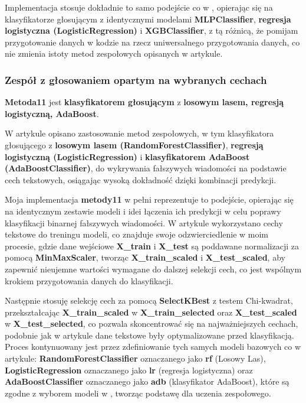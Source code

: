 Implementacja stosuje dokładnie to samo podejście co w \cite{metoda10}, opierając się na klasyfikatorze głosującym z identycznymi modelami \textbf{MLPClassifier}, \textbf{regresja logistyczna (LogisticRegression)} i \textbf{XGBClassifier}, z tą różnicą, że pomijam przygotowanie danych w kodzie na rzecz uniwersalnego przygotowania danych, co nie zmienia istoty metod zespołowych opisanych w artykule.

\subsubsection{Zespół z głosowaniem opartym na wybranych cechach}
\textbf{Metoda11} jest \textbf{klasyfikatorem głosującym} z \textbf{losowym lasem, regresją logistyczną, AdaBoost}.

W artykule \cite{metoda11} opisano zastosowanie metod zespołowych, w tym klasyfikatora głosującego z \textbf{losowym lasem (RandomForestClassifier)}, \textbf{regresją logistyczną (LogisticRegression)} i \textbf{klasyfikatorem AdaBoost (AdaBoostClassifier)}, do wykrywania fałszywych wiadomości na podstawie cech tekstowych, osiągając wysoką dokładność dzięki kombinacji predykcji.

Moja implementacja \textbf{metody11} w pełni reprezentuje to podejście, opierając się na identycznym zestawie modeli i idei łączenia ich predykcji w celu poprawy klasyfikacji binarnej fałszywych wiadomości. W artykule wykorzystano cechy tekstowe do treningu modeli, co znajduje swoje odzwierciedlenie w moim procesie, gdzie dane wejściowe \textbf{X\_train} i \textbf{X\_test} są poddawane normalizacji za pomocą \textbf{MinMaxScaler}, tworząc \textbf{X\_train\_scaled} i \textbf{X\_test\_scaled}, aby zapewnić nieujemne wartości wymagane do dalszej selekcji cech, co jest wspólnym krokiem przygotowania danych do klasyfikacji.

Następnie stosuję selekcję cech za pomocą \textbf{SelectKBest} z testem Chi-kwadrat, przekształcając \newline \textbf{X\_train\_scaled} w \textbf{X\_train\_selected} oraz \textbf{X\_test\_scaled} w \textbf{X\_test\_selected}, co pozwala skoncentrować się na najważniejszych cechach, podobnie jak w artykule dane tekstowe były optymalizowane przed klasyfikacją. Proces kontynuowany jest przez zdefiniowanie tych samych modeli bazowych co w artykule: \textbf{RandomForestClassifier} oznaczanego jako \textbf{rf} (Losowy Las), \textbf{LogisticRegression} oznaczanego jako \textbf{lr} (regresja logistyczna) oraz \textbf{AdaBoostClassifier} oznaczanego jako \textbf{adb} (klasyfikator AdaBoost), które są zgodne z wyborem modeli w \cite{metoda11}, tworząc podstawę dla uczenia zespołowego.

